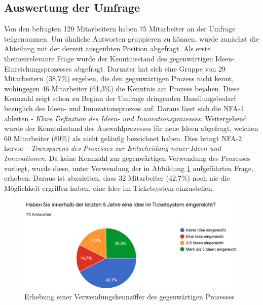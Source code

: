 
\subsection{Auswertung der Umfrage}\label{sec:Umfrageauswertung}

Von den befragten 120 Mitarbeitern haben 75 Mitarbeiter an der Umfrage teilgenommen. Um ähnliche Antworten gruppieren zu können, wurde zunächst die Abteilung mit der derzeit ausgeübten Position abgefragt. Als erste themenrelevante Frage wurde der Kenntnisstand des gegenwärtigen Ideen-Einreichungsprozesses abgefragt. Darunter hat sich eine Gruppe von 29 Mitarbeitern (38,7\%) ergeben, die den gegenwärtigen Prozess nicht kennt, wohingegen 46 Mitarbeiter (61,3\%) die Kenntnis am Prozess bejahen. Diese Kennzahl zeigt schon zu Beginn der Umfrage dringenden Handlungsbedarf bezüglich des Ideen- und Innovationsprozess auf. Daraus lässt sich die \ac{NFA}-1 ableiten - \emph{Klare Definition des Ideen- und Innovationsprozesses}. Weitergehend wurde der Kenntnisstand des Auswahlprozesses für neue Ideen abgefragt, welchen 60 Mitarbeiter (80\%) als nicht geläufig bezeichnet haben. Dies bringt \ac{NFA}-2 hervor - \emph{Transparenz des Prozesses zur Entscheidung neuer Ideen und Innovationen}. Da keine Kennzahl zur gegenwärtigen Verwendung des Prozesses vorliegt, wurde diese, unter Verwendung der in Abbildung \ref{fig:frage4} aufgeführten Frage, erhoben. Daraus ist abzuleiten, dass 32 Mitarbeiter (42,7\%) noch nie die Möglichkeit ergriffen haben, eine Idee im Ticketsystem einzustellen. 
\begin{figure}[]
	\centering
	\includegraphics[width=\textwidth]{images/Frage4}
	\caption{Erhebung einer Verwendungskennziffer des gegenwärtigen Prozesses}
	\label{fig:frage4}
\end{figure} 
